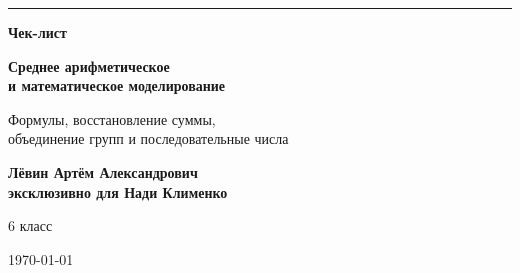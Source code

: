 \documentclass[a4paper,12pt]{article}
\begin{document}
\begin{titlepage}
\thispagestyle{empty}

\begin{center}

\vspace*{2.3cm}

{\color{darkaccent}\rule{0.33\linewidth}{1pt}}

\vspace{1.1cm}

{\Huge\bfseries Чек-лист}

\vspace{0.65cm}

{\LARGE\bfseries
Среднее арифметическое\\[0.2em]
и математическое моделирование}

\vspace{1.1cm}

{\large
Формулы, восстановление суммы,\\
объединение групп и последовательные числа}

\vfill

{\large\bfseries
Лёвин Артём Александрович\\[0.3em]
эксклюзивно для Нади Клименко}

\vspace{0.8cm}

{\large 6 класс}

\vspace{0.5cm}

{\large \today}

\vfill


\vspace{0.7cm}

\end{center}

\end{titlepage}

\end{document}
